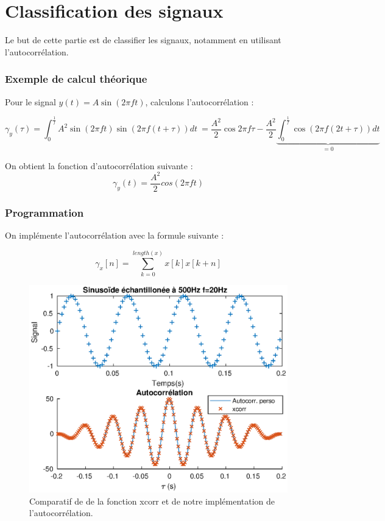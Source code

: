 \documentclass[french]{article}
\begin{document}
\FloatBarrier
\newpage
\part{ Classification des signaux}

Le but de cette partie est de classifier les signaux, notamment en utilisant l'autocorrélation.

\section{ Exemple de calcul théorique}

Pour le signal $y(t) = A \sin(2 \pi f t)$, calculons l'autocorrélation :

\[
\gamma_y(\tau) = \int_0^{\frac{1}{f}} A^2 \sin(2\pi f t) \sin(2 \pi f (t+\tau)) dt \
= \frac{A^2}{2} \cos 2\pi f \tau - \frac{A^2}{2}\underbrace{\int_0^{\frac{1}{f}} \cos (2 \pi f (2t + \tau)) dt}_{=0}
\]

On obtient la fonction d'autocorrélation suivante :
\[
\gamma_y (t) = \frac{A^2} {2} cos(2 \pi f t)
\]

\section{ Programmation}

On implémente l'autocorrélation avec la formule suivante :

\[
\gamma_x [n] = \sum_{k = 0} ^{length (x)} x[k]x[k+n]
\]

\begin{figure}[h!]
	\centering
	\includegraphics{images/autocorr.eps}
	\caption{Comparatif de de la fonction xcorr et de notre implémentation de l'autocorrélation.}
	\label{autocorr}
\end{figure}
\end{document}
